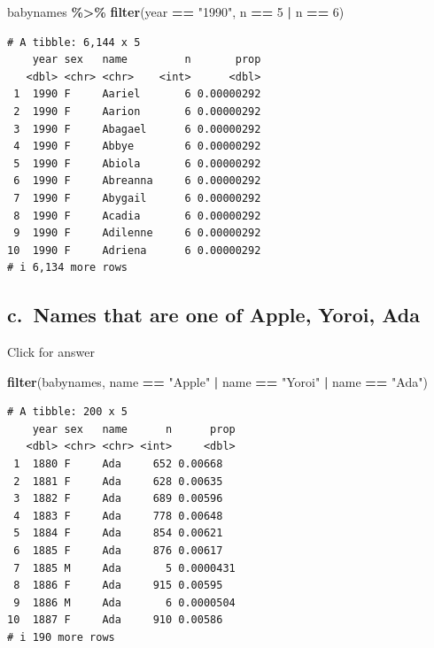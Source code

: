 \documentclass[
]{book}
\newenvironment{Shaded}{\begin{snugshade}}{\end{snugshade}}
\newcommand{\DecValTok}[1]{\textcolor[rgb]{0.00,0.00,0.81}{#1}}
\newcommand{\FunctionTok}[1]{\textcolor[rgb]{0.13,0.29,0.53}{\textbf{#1}}}
\newcommand{\NormalTok}[1]{#1}
\newcommand{\SpecialCharTok}[1]{\textcolor[rgb]{0.81,0.36,0.00}{\textbf{#1}}}
\newcommand{\StringTok}[1]{\textcolor[rgb]{0.31,0.60,0.02}{#1}}
\begin{document}
\begin{Shaded}
\begin{Highlighting}[]
\NormalTok{babynames }\SpecialCharTok{\%\textgreater{}\%} \FunctionTok{filter}\NormalTok{(year }\SpecialCharTok{==} \StringTok{"1990"}\NormalTok{, n }\SpecialCharTok{==} \DecValTok{5} \SpecialCharTok{|}\NormalTok{ n }\SpecialCharTok{==} \DecValTok{6}\NormalTok{)}
\end{Highlighting}
\end{Shaded}

\begin{verbatim}
# A tibble: 6,144 x 5
    year sex   name         n       prop
   <dbl> <chr> <chr>    <int>      <dbl>
 1  1990 F     Aariel       6 0.00000292
 2  1990 F     Aarion       6 0.00000292
 3  1990 F     Abagael      6 0.00000292
 4  1990 F     Abbye        6 0.00000292
 5  1990 F     Abiola       6 0.00000292
 6  1990 F     Abreanna     6 0.00000292
 7  1990 F     Abygail      6 0.00000292
 8  1990 F     Acadia       6 0.00000292
 9  1990 F     Adilenne     6 0.00000292
10  1990 F     Adriena      6 0.00000292
# i 6,134 more rows
\end{verbatim}

\hypertarget{c.-names-that-are-one-of-apple-yoroi-ada}{%
\subsection{c.~Names that are one of Apple, Yoroi, Ada}\label{c.-names-that-are-one-of-apple-yoroi-ada}}

Click for answer

\begin{Shaded}
\begin{Highlighting}[]
\FunctionTok{filter}\NormalTok{(babynames, name }\SpecialCharTok{==} \StringTok{"Apple"} \SpecialCharTok{|}\NormalTok{ name }\SpecialCharTok{==} \StringTok{"Yoroi"} \SpecialCharTok{|}\NormalTok{ name }\SpecialCharTok{==} \StringTok{"Ada"}\NormalTok{)}
\end{Highlighting}
\end{Shaded}

\begin{verbatim}
# A tibble: 200 x 5
    year sex   name      n      prop
   <dbl> <chr> <chr> <int>     <dbl>
 1  1880 F     Ada     652 0.00668  
 2  1881 F     Ada     628 0.00635  
 3  1882 F     Ada     689 0.00596  
 4  1883 F     Ada     778 0.00648  
 5  1884 F     Ada     854 0.00621  
 6  1885 F     Ada     876 0.00617  
 7  1885 M     Ada       5 0.0000431
 8  1886 F     Ada     915 0.00595  
 9  1886 M     Ada       6 0.0000504
10  1887 F     Ada     910 0.00586  
# i 190 more rows
\end{verbatim}
\end{document}
